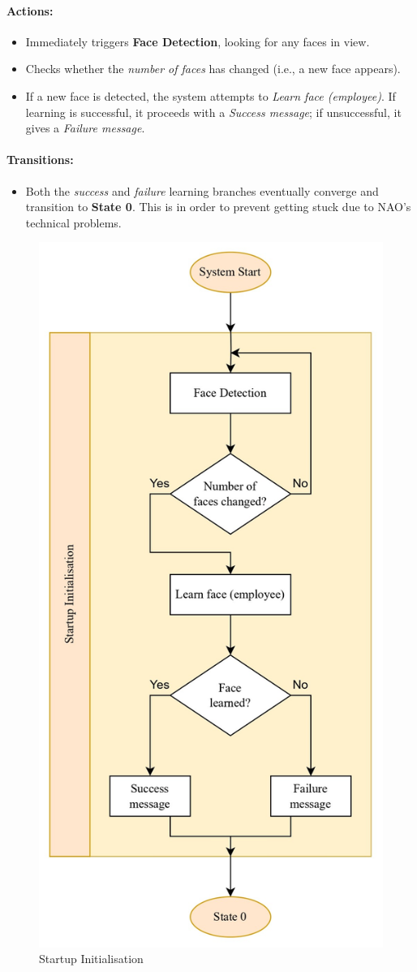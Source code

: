 \documentclass[conference]{IEEEtran}
\begin{document}
\paragraph{Actions:}
\begin{itemize}
  \item Immediately triggers \textbf{Face Detection}, looking for any faces in view.
  \item Checks whether the \emph{number of faces} has changed (i.e., a new face appears).
  \item If a new face is detected, the system attempts to \emph{Learn face (employee)}. If learning is successful, it proceeds with a \emph{Success message}; if unsuccessful, it gives a \emph{Failure message}.
\end{itemize}

\paragraph{Transitions:}
\begin{itemize}
  \item Both the \emph{success} and \emph{failure} learning branches eventually converge and transition to \textbf{State 0}. This is in order to prevent getting stuck due to NAO's technical problems.
\end{itemize}

\begin{figure}
    \centering
    \includegraphics[width=.6\linewidth]{Startup Initialisation.jpg}
    \caption{Startup Initialisation}
    \label{Startup Initialisation}
\end{figure}
\end{document}
